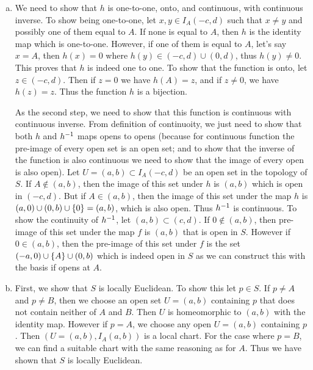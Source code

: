 \begin{solution}
	\begin{enumerate}[(a)]
		\item We need to show that $ h $ is one-to-one, onto, and continuous, with continuous inverse. To show being one-to-one, let $ x,y \in I_A(-c,d) $ such that $ x\neq y $ and possibly one of them equal to $ A $. If none is equal to $ A $, then $ h $ is the identity map which is one-to-one. However, if one of them is equal to $ A $, let's say $ x = A $, then $ h(x) = 0 $ where $ h(y) \in (-c,d)\cup(0,d)$, thus $ h(y) \neq 0 $. This proves that $ h $ is indeed one to one. To show that the function is onto, let $ z \in (-c,d) $. Then if $ z = 0 $ we have $ h(A) = z $, and if $ z \neq 0 $, we have $ h(z) = z $. Thus the function $ h $ is a bijection.
		
		As the second step, we need to show that this function is continuous with continuous inverse. From definition of continuoity, we just need to show that both $ h $ and $ h^{-1} $ maps opens to opens (because for continuous function the pre-image of every open set is an open set; and to show that the inverse of the function is also continuous we need to show that the image of every open is also open).
		Let $ U = (a,b) \subset I_A(-c,d) $ be an open set in the topology of $ S $. If $ A \notin (a,b) $, then the image of this set under $ h $ is $ (a,b) $ which is open in $ (-c,d) $. But if $ A \in (a,b) $, then the image of this set under the map $ h $ is $ (a,0)\cup(0,b)\cup\{0\} = (a,b) $, which is also open. Thus $ h^{-1} $ is continuous. To show the continuity of $ h^{-1} $, let $ (a,b) \subset (c,d) $. If $ 0 \notin (a,b) $, then pre-image of this set under the map $ f $ is $ (a,b) $ that is open in $ S $. However if $ 0 \in (a,b) $, then the pre-image of this set under $ f $ is the set $ (-a,0) \cup \{A\} \cup (0,b) $ which is indeed open in $ S $ as we can construct this with the basis if opens at $ A $.
		
		\item First, we show that $ S $ is locally Euclidean. To show this let $ p \in S $. If $ p \neq A $ and $ p \neq B $, then we choose an open set $ U =  (a,b) $ containing $ p $ that does not contain neither of $ A $ and  $ B $. Then $ U $ is homeomorphic to $ (a,b) $ with the identity map. However if $ p = A $, we choose any open $ U = (a,b) $ containing $ p $. Then $ (U = (a,b),I_A(a,b)) $ is a local chart. For the case where $ p = B $, we can find a suitable chart with the same reasoning as for $ A $. Thus we have shown that $ S $ is locally Euclidean.
		

\end{enumerate}
\end{solution}
